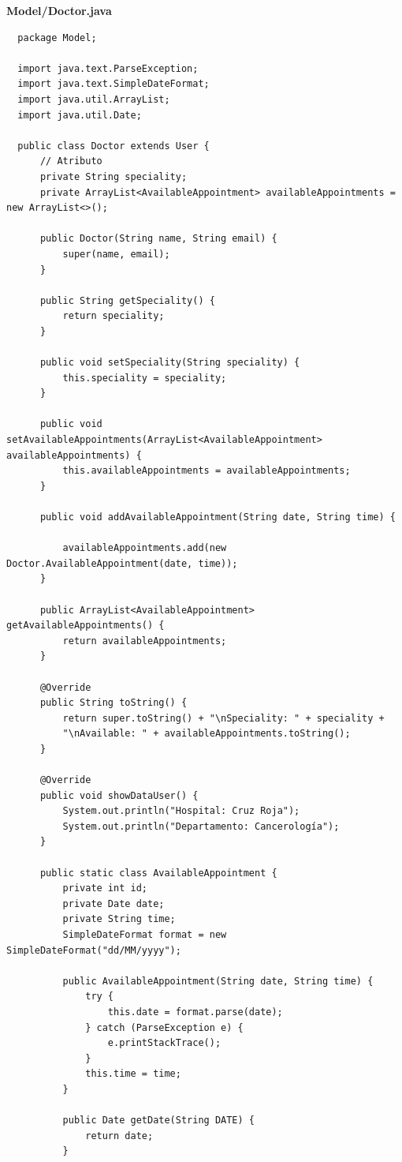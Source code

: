 \documentclass{article}
\begin{document}
\textbf{Model/Doctor.java}
\begin{verbatim}
  package Model;

  import java.text.ParseException;
  import java.text.SimpleDateFormat;
  import java.util.ArrayList;
  import java.util.Date;

  public class Doctor extends User {
      // Atributo
      private String speciality;
      private ArrayList<AvailableAppointment> availableAppointments = new ArrayList<>();

      public Doctor(String name, String email) {
          super(name, email);
      }

      public String getSpeciality() {
          return speciality;
      }

      public void setSpeciality(String speciality) {
          this.speciality = speciality;
      }

      public void setAvailableAppointments(ArrayList<AvailableAppointment> availableAppointments) {
          this.availableAppointments = availableAppointments;
      }

      public void addAvailableAppointment(String date, String time) {

          availableAppointments.add(new Doctor.AvailableAppointment(date, time));
      }

      public ArrayList<AvailableAppointment> getAvailableAppointments() {
          return availableAppointments;
      }

      @Override
      public String toString() {
          return super.toString() + "\nSpeciality: " + speciality +
          "\nAvailable: " + availableAppointments.toString();
      }

      @Override
      public void showDataUser() {
          System.out.println("Hospital: Cruz Roja");
          System.out.println("Departamento: Cancerología");
      }

      public static class AvailableAppointment {
          private int id;
          private Date date;
          private String time;
          SimpleDateFormat format = new SimpleDateFormat("dd/MM/yyyy");

          public AvailableAppointment(String date, String time) {
              try {
                  this.date = format.parse(date);
              } catch (ParseException e) {
                  e.printStackTrace();
              }
              this.time = time;
          }

          public Date getDate(String DATE) {
              return date;
          }


\end{verbatim}
\end{document}
